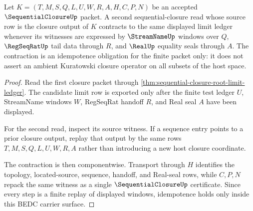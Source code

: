 \begin{theorem}
\label{thm:sequentialclosure-kuratowski-idempotence}
Let $K=(T,M,S,Q,L,U,W,R,A,H,C,P,N)$ be an accepted $\SequentialClosureUp$ packet. A second sequential-closure read whose source row is the closure output of $K$ contracts to the same displayed limit ledger whenever its witnesses are expressed by $\StreamNameUp$ windows over $Q$, $\RegSeqRatUp$ tail data through $R$, and $\RealUp$ equality seals through $A$. The contraction is an idempotence obligation for the finite packet only: it does not assert an ambient Kuratowski closure operator on all subsets of the host space.
\end{theorem}
\begin{proof}
Read the first closure packet through \autoref{thm:sequential-closure-root-limit-ledger}. The candidate limit row is exported only after the finite test ledger $U$, StreamName windows $W$, RegSeqRat handoff $R$, and Real seal $A$ have been displayed.

For the second read, inspect its source witness. If a sequence entry points to a prior closure output, replay that output by the same rows $T,M,S,Q,L,U,W,R,A$ rather than introducing a new host closure coordinate.

The contraction is then componentwise. Transport through $H$ identifies the topology, located-source, sequence, handoff, and Real-seal rows, while $C,P,N$ repack the same witness as a single $\SequentialClosureUp$ certificate. Since every step is a finite replay of displayed windows, idempotence holds only inside this BEDC carrier surface.
\end{proof}

